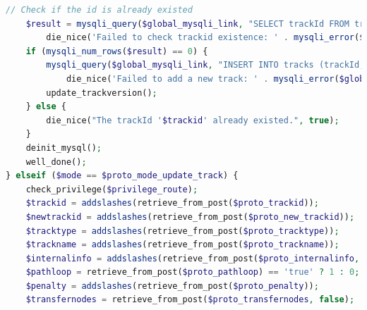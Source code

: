 \documentclass[a4paper,twoside]{article}
\begin{document}
\begin{enumerate}
\begin{lstlisting}[language=PHP,basicstyle=\tiny,caption=handle.php,label={lst:handle.php}]
	// Check if the id is already existed
	$result = mysqli_query($global_mysqli_link, "SELECT trackId FROM tracks WHERE trackId='$trackid'") or
		die_nice('Failed to check trackid existence: ' . mysqli_error($global_mysqli_link), true);
	if (mysqli_num_rows($result) == 0) {
		mysqli_query($global_mysqli_link, "INSERT INTO tracks (trackId, trackTypeId, trackName, penalty, internalInfo) VALUES ('$trackid','$tracktype','$trackname','$penalty','$internalinfo')") or
			die_nice('Failed to add a new track: ' . mysqli_error($global_mysqli_link), true);
		update_trackversion();
	} else {
		die_nice("The trackId '$trackid' already existed.", true);
	}
	deinit_mysql();
	well_done();
} elseif ($mode == $proto_mode_update_track) {
	check_privilege($privilege_route);
	$trackid = addslashes(retrieve_from_post($proto_trackid));
	$newtrackid = addslashes(retrieve_from_post($proto_new_trackid));
	$tracktype = addslashes(retrieve_from_post($proto_tracktype));
	$trackname = addslashes(retrieve_from_post($proto_trackname));
	$internalinfo = addslashes(retrieve_from_post($proto_internalinfo, false)) or $internalinfo = '';
	$pathloop = retrieve_from_post($proto_pathloop) == 'true' ? 1 : 0;
	$penalty = addslashes(retrieve_from_post($proto_penalty));
	$transfernodes = retrieve_from_post($proto_transfernodes, false);
	

\end{lstlisting}
\end{enumerate}
\end{document}
